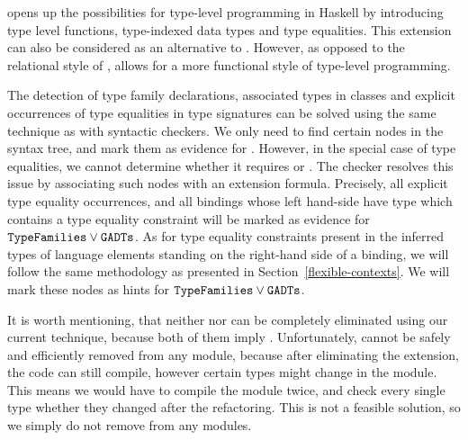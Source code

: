 \documentclass[main.tex]{subfiles}
\begin{document}
	
	 opens up the possibilities for type-level programming in Haskell by introducing type level functions, type-indexed data types and type equalities. This extension can also be considered as an alternative to . However, as opposed to the relational style of ,  allows for a more functional style of type-level programming.
	
	The detection of type family declarations, associated types in classes and explicit occurrences of type equalities in type signatures can be solved using the same technique as with syntactic checkers. We only need to find certain nodes in the syntax tree, and mark them as evidence for . However, in the special case of type equalities, we cannot determine whether it requires  or . The checker resolves this issue by associating such nodes with an extension formula. Precisely, all explicit type equality occurrences, and all bindings whose left hand-side have type which contains a type equality constraint will be marked as evidence for $\texttt{TypeFamilies} \lor \texttt{GADTs}$. As for type equality constraints present in the inferred types of language elements standing on the right-hand side of a binding, we will follow the same methodology as presented in Section~\ref{flexible-contexts}. We will mark these nodes as hints for $\texttt{TypeFamilies} \lor \texttt{GADTs}$.
	
	It is worth mentioning, that neither  nor  can be completely eliminated using our current technique, because both of them imply . Unfortunately,  cannot be safely and efficiently removed from any module, because after eliminating the extension, the code can still compile, however certain types might change in the module. This means we would have to compile the module twice, and check every single type whether they changed after the refactoring. This is not a feasible solution, so we simply do not remove  from any modules.
	
	
\end{document}
